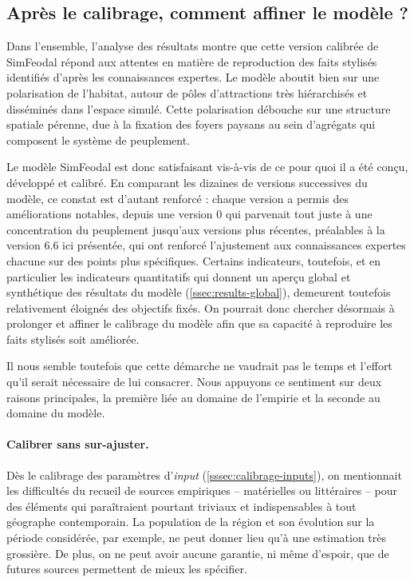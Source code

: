 \subsection{Après le calibrage, comment affiner le modèle ? \label{subsec:depasser-calibrage}}

Dans l'ensemble, l'analyse des résultats montre que cette version calibrée de SimFeodal répond aux attentes en matière de reproduction des faits stylisés identifiés d'après les connaissances expertes.
Le modèle aboutit bien sur une polarisation de l'habitat, autour de pôles d'attractions très hiérarchisés et disséminés dans l'espace simulé.
Cette polarisation débouche sur une structure spatiale pérenne, due à la fixation des foyers paysans au sein d'agrégats qui composent le système de peuplement.

Le modèle SimFeodal est donc satisfaisant vis-à-vis de ce pour quoi il a été conçu, développé et calibré.
En comparant les dizaines de versions successives du modèle, ce constat est d'autant renforcé : chaque version a permis des améliorations notables, depuis une version 0 qui parvenait tout juste à une concentration du peuplement jusqu'aux versions plus récentes, préalables à la version 6.6 ici présentée, qui ont renforcé l'ajustement aux connaissances expertes chacune sur des points plus spécifiques.
Certains indicateurs, toutefois, et en particulier les indicateurs quantitatifs qui donnent un aperçu global et synthétique des résultats du modèle (\cref{ssec:results-global}), demeurent toutefois relativement éloignés des objectifs fixés.
On pourrait donc chercher désormais à prolonger et affiner le calibrage du modèle afin que sa capacité à reproduire les faits stylisés soit améliorée.

Il nous semble toutefois que cette démarche ne vaudrait pas le temps et l'effort qu'il serait nécessaire de lui consacrer.
Nous appuyons ce sentiment sur deux raisons principales, la première liée au domaine de l'empirie et la seconde au domaine du modèle.

\paragraph{Calibrer sans sur-ajuster.}
Dès le calibrage des paramètres d'\textit{input} (\cref{sssec:calibrage-inputs}), on mentionnait les difficultés du recueil de sources empiriques -- matérielles ou littéraires -- pour des éléments qui paraîtraient pourtant triviaux et indispensables à tout géographe contemporain.
La population de la région et son évolution sur la période considérée, par exemple, ne peut donner lieu qu'à une estimation très grossière.
De plus, on ne peut avoir aucune garantie, ni même d'espoir, que de futures sources permettent de mieux les spécifier.

